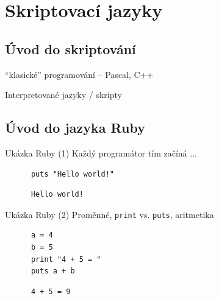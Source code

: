 \documentclass{beamer}
\begin{document}
\section{Skriptovací jazyky}

\subsection{Úvod do skriptování}

\begin{frame}{``klasické'' programování -- Pascal, C++}
  
\end{frame}

\begin{frame}{Interpretované jazyky / skripty}
  
\end{frame}

\subsection{Úvod do jazyka Ruby}

\begin{frame}[fragile]{Ukázka Ruby (1)}
  Každý programátor tím začíná ...
  \begin{block}{}
    \smallskip \footnotesize
    \begin{verbatim}
      puts "Hello world!"
    \end{verbatim}    
  \end{block}
  \pause
  \begin{block}{}
    \smallskip \footnotesize
    \begin{verbatim}
      Hello world!
    \end{verbatim}
  \end{block}
\end{frame}

\begin{frame}[fragile]{Ukázka Ruby (2)}
  Proměnné, \texttt{print} vs. \texttt{puts}, aritmetika
  \begin{block}{}
    \smallskip \footnotesize
    \begin{verbatim}
      a = 4
      b = 5
      print "4 + 5 = "
      puts a + b
    \end{verbatim}    
  \end{block}
  \pause
  \begin{block}{}
    \smallskip \footnotesize
    \begin{verbatim}
      4 + 5 = 9
    \end{verbatim}
  \end{block}
\end{frame}
\end{document}
